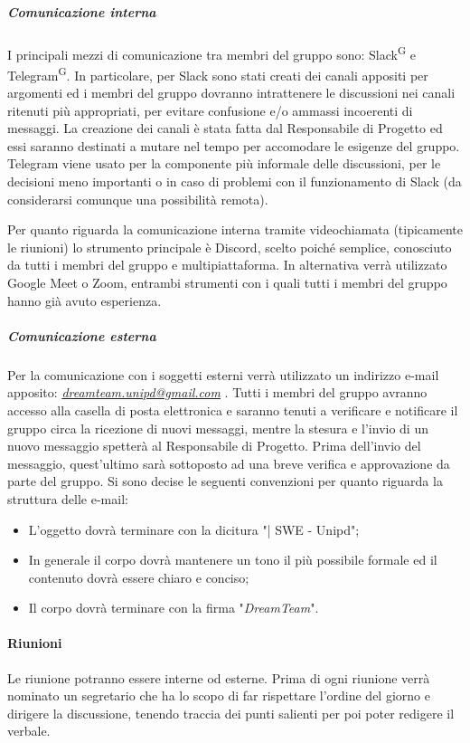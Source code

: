 \subparagraph{Comunicazione interna}
I principali mezzi di comunicazione tra membri del gruppo sono: Slack\textsuperscript{G} e Telegram\textsuperscript{G}. 
In particolare, per Slack sono stati creati dei canali appositi per argomenti ed i membri del gruppo dovranno intrattenere le discussioni nei canali ritenuti più appropriati, per evitare confusione e/o ammassi incoerenti di messaggi. La creazione dei canali è stata fatta dal Responsabile di Progetto ed essi saranno destinati a mutare nel tempo per accomodare le esigenze del gruppo.
Telegram viene usato per la componente più informale delle discussioni, per le decisioni meno importanti o in caso di problemi con il funzionamento di Slack (da considerarsi comunque una possibilità remota). 

Per quanto riguarda la comunicazione interna tramite videochiamata (tipicamente le riunioni) lo strumento principale è Discord, scelto poiché semplice, conosciuto da tutti i membri del gruppo e multipiattaforma. In alternativa verrà utilizzato Google Meet o Zoom, entrambi strumenti con i quali tutti i membri del gruppo hanno già avuto esperienza.

\subparagraph{Comunicazione esterna}
Per la comunicazione con i soggetti esterni verrà utilizzato un indirizzo e-mail apposito: \textsl{\href{mailto:dreamteam.unipd@gmail.com}{dreamteam.unipd@gmail.com}} .
Tutti i membri del gruppo avranno accesso alla casella di posta elettronica e saranno tenuti a verificare e notificare il gruppo circa la ricezione di nuovi messaggi, mentre la stesura e l'invio di un nuovo messaggio spetterà al Responsabile di Progetto. Prima dell'invio del messaggio, quest'ultimo sarà sottoposto ad una breve verifica e approvazione da parte del gruppo.
Si sono decise le seguenti convenzioni per quanto riguarda la struttura delle e-mail:
\begin{itemize}
\item L'oggetto dovrà terminare con la dicitura "| SWE - Unipd";
\item In generale il corpo dovrà mantenere un tono il più possibile formale ed il contenuto dovrà essere chiaro e conciso;
\item Il corpo dovrà terminare con la firma "\textit{DreamTeam}".
\end{itemize}

\paragraph{Riunioni}
Le riunione potranno essere interne od esterne. Prima di ogni riunione verrà nominato un segretario che ha lo scopo di far rispettare l'ordine del giorno e dirigere la discussione, tenendo traccia dei punti salienti per poi poter redigere il verbale.

